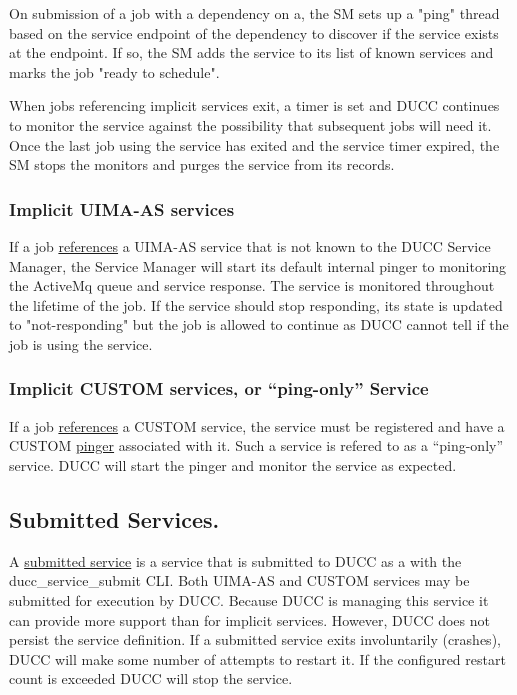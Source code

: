       On submission of a job with a dependency on a, the SM sets up a "ping" thread based on the
      service endpoint of the dependency to discover if the service exists at the endpoint. If so,
      the SM adds the service to its list of known services and marks the job "ready to schedule".

      When jobs referencing implicit services exit, a timer is set and DUCC continues to monitor the
      service against the possibility that subsequent jobs will need it. Once the last job using the
      service has exited and the service timer expired, the SM stops the monitors and purges the
      service from its records.

      \subsubsection{Implicit UIMA-AS services}
      If a job \hyperref[sec:service.endpoints]{references} a UIMA-AS service that is not known to the
      DUCC Service Manager, the Service Manager will start
      its default internal pinger to monitoring the ActiveMq queue and service response.  The
      service is monitored throughout the lifetime of the job. If the service should stop
      responding, its state is updated to "not-responding" but the job is allowed to continue as
      DUCC cannot tell if the job is using the service.

      \subsubsection{Implicit CUSTOM services, or ``ping-only'' Service} 
      If a job \hyperref[sec:service.endpoints]{references} a CUSTOM service, the service must be
      registered and have a CUSTOM \hyperref[sec:service.pingers]{pinger} associated with it. Such a
      service is refered to as a ``ping-only'' service.  DUCC will start the pinger and monitor the
      service as expected.
      
      
      \subsection{Submitted Services.} A \hyperref[sec:cli.service-submit]{submitted service} is a
      service that is submitted to DUCC as a with the ducc\_service\_submit CLI.  Both UIMA-AS and
      CUSTOM services may be submitted for execution by DUCC. Because DUCC is managing this service
      it can provide more support than for implicit services.  However, DUCC does not persist the
      service definition. If a submitted service exits involuntarily (crashes), DUCC will make
      some number of attempts to restart it.  If the configured restart count is exceeded DUCC
      will stop the service.

